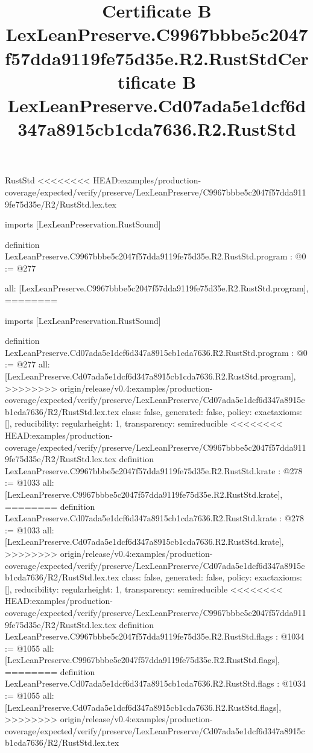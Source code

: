 \begin{lexlean}{RustStd}
<<<<<<<< HEAD:examples/production-coverage/expected/verify/preserve/LexLeanPreserve/C9967bbbe5c2047f57dda9119fe75d35e/R2/RustStd.lex.tex
\title{Certificate B LexLeanPreserve.C9967bbbe5c2047f57dda9119fe75d35e.R2.RustStd}
\begin{coremodule}
imports [LexLeanPreservation.RustSound]

definition LexLeanPreserve.C9967bbbe5c2047f57dda9119fe75d35e.R2.RustStd.program : @0 := @277 {
  all: [LexLeanPreserve.C9967bbbe5c2047f57dda9119fe75d35e.R2.RustStd.program],
========
\title{Certificate B LexLeanPreserve.Cd07ada5e1dcf6d347a8915cb1cda7636.R2.RustStd}
\begin{coremodule}
imports [LexLeanPreservation.RustSound]

definition LexLeanPreserve.Cd07ada5e1dcf6d347a8915cb1cda7636.R2.RustStd.program : @0 := @277 {
  all: [LexLeanPreserve.Cd07ada5e1dcf6d347a8915cb1cda7636.R2.RustStd.program],
>>>>>>>> origin/release/v0.4:examples/production-coverage/expected/verify/preserve/LexLeanPreserve/Cd07ada5e1dcf6d347a8915cb1cda7636/R2/RustStd.lex.tex
  class: false,
  generated: false,
  policy: exact{axioms: []},
  reducibility: regular{height: 1},
  transparency: semireducible
}
<<<<<<<< HEAD:examples/production-coverage/expected/verify/preserve/LexLeanPreserve/C9967bbbe5c2047f57dda9119fe75d35e/R2/RustStd.lex.tex
definition LexLeanPreserve.C9967bbbe5c2047f57dda9119fe75d35e.R2.RustStd.krate : @278 := @1033 {
  all: [LexLeanPreserve.C9967bbbe5c2047f57dda9119fe75d35e.R2.RustStd.krate],
========
definition LexLeanPreserve.Cd07ada5e1dcf6d347a8915cb1cda7636.R2.RustStd.krate : @278 := @1033 {
  all: [LexLeanPreserve.Cd07ada5e1dcf6d347a8915cb1cda7636.R2.RustStd.krate],
>>>>>>>> origin/release/v0.4:examples/production-coverage/expected/verify/preserve/LexLeanPreserve/Cd07ada5e1dcf6d347a8915cb1cda7636/R2/RustStd.lex.tex
  class: false,
  generated: false,
  policy: exact{axioms: []},
  reducibility: regular{height: 1},
  transparency: semireducible
}
<<<<<<<< HEAD:examples/production-coverage/expected/verify/preserve/LexLeanPreserve/C9967bbbe5c2047f57dda9119fe75d35e/R2/RustStd.lex.tex
definition LexLeanPreserve.C9967bbbe5c2047f57dda9119fe75d35e.R2.RustStd.flags : @1034 := @1055 {
  all: [LexLeanPreserve.C9967bbbe5c2047f57dda9119fe75d35e.R2.RustStd.flags],
========
definition LexLeanPreserve.Cd07ada5e1dcf6d347a8915cb1cda7636.R2.RustStd.flags : @1034 := @1055 {
  all: [LexLeanPreserve.Cd07ada5e1dcf6d347a8915cb1cda7636.R2.RustStd.flags],
>>>>>>>> origin/release/v0.4:examples/production-coverage/expected/verify/preserve/LexLeanPreserve/Cd07ada5e1dcf6d347a8915cb1cda7636/R2/RustStd.lex.tex
}}}
\end{coremodule}}
\end{coremodule}
\end{lexlean}
